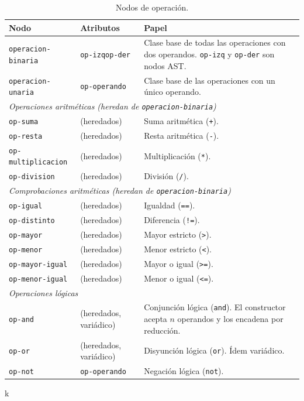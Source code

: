 \documentclass[12pt,a4paper]{report}
\begin{document}
\begin{table}[h!]
\centering
\caption{Nodos de operación.}
\label{tab:operaciones}
\renewcommand{\arraystretch}{1.3}
\begin{tabular}{p{4.8cm} p{4.5cm} p{5.5cm}}
\hline
\textbf{Nodo} & \textbf{Atributos} & \textbf{Papel} \\
\hline
\texttt{operacion-binaria}
  & \texttt{op-izq}\newline\texttt{op-der}
  & Clase base de todas las operaciones con dos operandos.
    \texttt{op-izq} y \texttt{op-der} son nodos AST. \\
\hline
\texttt{operacion-unaria}
  & \texttt{op-operando}
  & Clase base de las operaciones con un único operando. \\
\hline
\hline
\multicolumn{3}{l}{\textit{Operaciones aritméticas (heredan de
  \texttt{operacion-binaria})}} \\
\hline
\texttt{op-suma}
  & (heredados) & Suma aritmética (\texttt{+}). \\
\texttt{op-resta}
  & (heredados) & Resta aritmética (\texttt{-}). \\
\texttt{op-multiplicacion}
  & (heredados) & Multiplicación (\texttt{*}). \\
\texttt{op-division}
  & (heredados) & División (\texttt{/}). \\
\hline
\hline
\multicolumn{3}{l}{\textit{Comprobaciones aritméticas (heredan de
  \texttt{operacion-binaria})}} \\
\hline
\texttt{op-igual}
  & (heredados) & Igualdad (\texttt{==}). \\
\texttt{op-distinto}
  & (heredados) & Diferencia (\texttt{!=}). \\
\texttt{op-mayor}
  & (heredados) & Mayor estricto (\texttt{>}). \\
\texttt{op-menor}
  & (heredados) & Menor estricto (\texttt{<}). \\
\texttt{op-mayor-igual}
  & (heredados) & Mayor o igual (\texttt{>=}). \\
\texttt{op-menor-igual}
  & (heredados) & Menor o igual (\texttt{<=}). \\
\hline
\hline
\multicolumn{3}{l}{\textit{Operaciones lógicas}} \\
\hline
\texttt{op-and}
  & (heredados, variádico)
  & Conjunción lógica (\texttt{and}).  El constructor
    acepta $n$ operandos y los encadena por reducción. \\
\texttt{op-or}
  & (heredados, variádico)
  & Disyunción lógica (\texttt{or}).  Ídem variádico. \\
\texttt{op-not}
  & \texttt{op-operando}
  & Negación lógica (\texttt{not}). \\
\hline
\end{tabular}k
\end{table}
\end{document}
